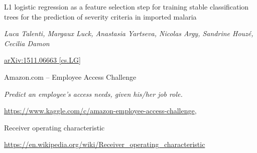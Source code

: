 \documentclass[11pt]{article}
\begin{document}
    \begin{thebibliography}{9}

        L1 logistic regression as a feature selection step for training stable 
        classification trees for the prediction of severity criteria in imported malaria

        \textit{Luca Talenti, Margaux Luck, Anastasia Yartseva, Nicolas Argy, Sandrine Houzé, Cecilia Damon}

        \href{https://arxiv.org/abs/1511.06663}{arXiv:1511.06663 [cs.LG]}

        Amazon.com -- Employee Access Challenge 

        \textit{Predict an employee's access needs, given his/her job role.}

        \href{https://www.kaggle.com/c/amazon-employee-access-challenge}
        {https://www.kaggle.com/c/amazon-employee-access-challenge},
        

        Receiver operating characteristic 

        \href{https://en.wikipedia.org/wiki/Receiver_operating_characteristic}
        {https://en.wikipedia.org/wiki/Receiver\_operating\_characteristic}

    \end{thebibliography}
\end{document}
